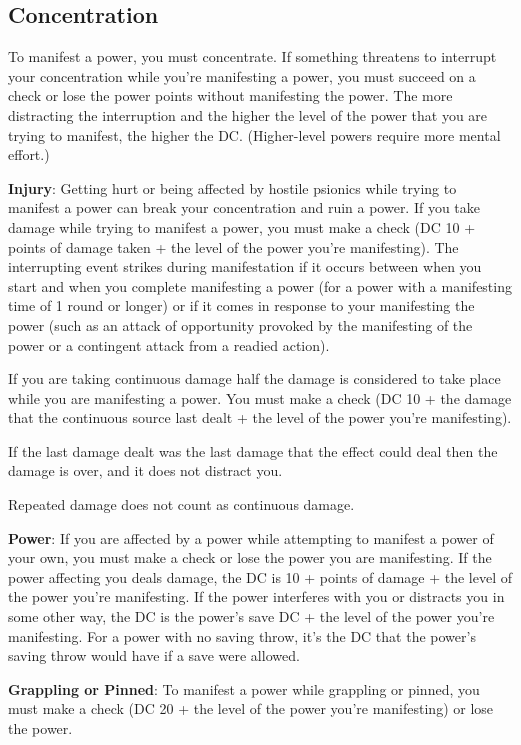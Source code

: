 \subsection{Concentration}
To manifest a power, you must concentrate. If something threatens to interrupt your concentration while you're manifesting a power, you must succeed on a  check or lose the power points without manifesting the power. The more distracting the interruption and the higher the level of the power that you are trying to manifest, the higher the DC. (Higher-level powers require more mental effort.)

\textbf{Injury}: Getting hurt or being affected by hostile psionics while trying to manifest a power can break your concentration and ruin a power. If you take damage while trying to manifest a power, you must make a  check (DC 10 + points of damage taken + the level of the power you're manifesting). The interrupting event strikes during manifestation if it occurs between when you start and when you complete manifesting a power (for a power with a manifesting time of 1 round or longer) or if it comes in response to your manifesting the power (such as an attack of opportunity provoked by the manifesting of the power or a contingent attack from a readied action).

If you are taking continuous damage half the damage is considered to take place while you are manifesting a power. You must make a  check (DC 10 + \onehalf the damage that the continuous source last dealt + the level of the power you're manifesting).

If the last damage dealt was the last damage that the effect could deal then the damage is over, and it does not distract you.

Repeated damage does not count as continuous damage.

\textbf{Power}: If you are affected by a power while attempting to manifest a power of your own, you must make a  check or lose the power you are manifesting. If the power affecting you deals damage, the  DC is 10 + points of damage + the level of the power you're manifesting. If the power interferes with you or distracts you in some other way, the  DC is the power's save DC + the level of the power you're manifesting. For a power with no saving throw, it's the DC that the power's saving throw would have if a save were allowed.

\textbf{Grappling or Pinned}: To manifest a power while grappling or pinned, you must make a  check (DC 20 + the level of the power you're manifesting) or lose the power.

